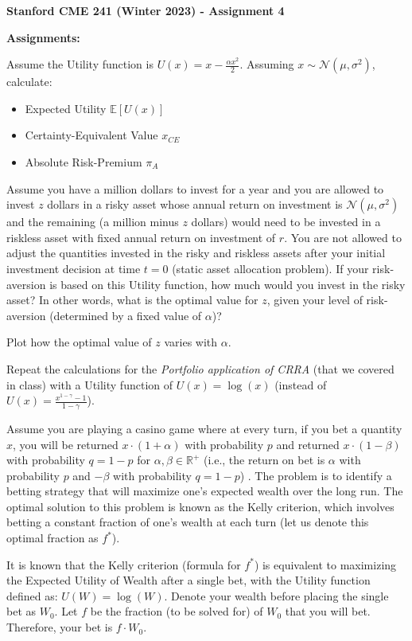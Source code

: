 \documentclass[12pt]{exam}
\begin{document}
\begin{center}
{\large {\bf Stanford CME 241 (Winter 2023) - Assignment 4}}
\end{center}
 
{\large{\bf Assignments:}}
\begin{questions}
\question Assume the Utility function is $U(x) = x - \frac {\alpha x^2} 2$. Assuming $x \sim \mathcal{N}(\mu, \sigma^2)$, calculate:
\begin{itemize}
\item Expected Utility $\mathbb{E}[U(x)]$
\item Certainty-Equivalent Value $x_{CE}$
\item Absolute Risk-Premium $\pi_A$	
\end{itemize}
Assume you have a million dollars to invest for a year and you are allowed to invest $z$ dollars in a risky asset whose annual return on investment is $\mathcal{N}(\mu, \sigma^2)$ and the remaining (a million minus $z$ dollars) would need to be invested in a riskless asset with fixed annual return on investment of $r$. You are not allowed to adjust the quantities invested in the risky and riskless assets after your initial investment decision at time $t=0$ (static asset allocation problem). If your risk-aversion is based on this Utility function, how much would you invest in the risky asset? In other words, what is the optimal value for $z$, given your level of risk-aversion (determined by a fixed value of $\alpha$)?

Plot how the optimal value of $z$ varies with $\alpha$.

\question Repeat the calculations for the {\em Portfolio application of CRRA} (that we covered in class) with a Utility function of $U(x) = \log(x)$ (instead of $U(x) = \frac {x^{1 - \gamma} - 1} {1 - \gamma}$).

\question Assume you are playing a casino game where at every turn, if you bet a quantity $x$, you will be returned $x \cdot (1 + \alpha)$ with probability $p$ and returned $x \cdot (1 - \beta)$ with probability $q = 1 - p$ for $\alpha, \beta \in \mathbb{R}^+$ (i.e., the return on bet is $\alpha$ with probability $p$ and $-\beta$ with probability $q = 1-p$) . The problem is to identify a betting strategy that will maximize one's expected wealth over the long run. The optimal solution to this problem is known as the Kelly criterion, which involves betting a constant fraction of one's wealth at each turn (let us denote this optimal fraction as $f^*$).

It is known that the Kelly criterion (formula for $f^*$) is equivalent to maximizing the Expected Utility of Wealth after a single bet, with the Utility function defined as: $U(W) = \log(W)$. Denote your wealth before placing the single bet as $W_0$. Let $f$ be the fraction (to be solved for) of $W_0$ that you will bet. Therefore, your bet is $f \cdot W_0$.


\end{questions}
\end{document}
